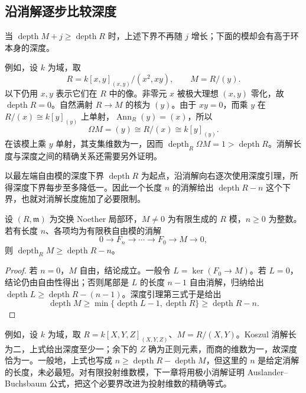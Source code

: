 \subsection{沿消解逐步比较深度}
\label{b3:subsec:1603:03}

当 \(\operatorname{depth}M+j\ge\operatorname{depth}R\) 时，上述下界不再随 \(j\) 增长；下面的模却会有高于环本身的深度。

\ProseParagraphBreak

例如，设 \(k\) 为域，取
\[
	R=k[x,y]_{(x,y)}/(x^2,xy),\qquad M=R/(y).
\]
以下仍用 \(x,y\) 表示它们在 \(R\) 中的像。非零元 \(x\) 被极大理想 \((x,y)\) 零化，故 \(\operatorname{depth}R=0\)。自然满射 \(R\to M\) 的核为 \((y)\)。由于 \(xy=0\)，而乘 \(y\) 在 \(R/(x)\cong k[y]_{(y)}\) 上单射，\(\operatorname{Ann}_R(y)=(x)\)，所以
\[
	\Omega M=(y)\cong R/(x)\cong k[y]_{(y)}.
\]
在该模上乘 \(y\) 单射，其支集维数为一，因而 \(\operatorname{depth}_R\Omega M=1>\operatorname{depth}R\)。消解长度与深度之间的精确关系还需要另外证明。

以最左端自由模的深度下界 \(\operatorname{depth}R\) 为起点，沿消解向右逐次使用深度引理，所得深度下界每步至多降低一。因此一个长度 \(n\) 的消解给出 \(\operatorname{depth}R-n\) 这个下界，也就对消解长度施加了必要限制。

\begin{proposition}\label{b3:prop:finite-resolution-depth-bound}
	设 \((R,\mathfrak m)\) 为交换 Noether 局部环，\(M\ne0\) 为有限生成的 \(R\) 模，\(n\ge0\) 为整数。若有长度 \(n\)、各项均为有限秩自由模的消解
	\[
		0\longrightarrow F_n\longrightarrow\cdots\longrightarrow F_0 \longrightarrow M\longrightarrow0,
	\]
	则 \(\operatorname{depth}_RM\ge\operatorname{depth}R-n\)。
\end{proposition}
\begin{proof}
	若 \(n=0\)，\(M\) 自由，结论成立。一般令 \(L=\ker(F_0\rightarrow M)\)。若 \(L=0\)，结论仍由自由性得出；否则尾部是 \(L\) 的长度 \(n-1\) 自由消解，归纳给出 \(\operatorname{depth}L\ge\operatorname{depth}R-(n-1)\)。深度引理第三式于是给出
	\[
		\operatorname{depth}M\ge \min\{\operatorname{depth}L-1,\operatorname{depth}R\} \ge\operatorname{depth}R-n.
	\]
\end{proof}

例如，设 \(k\) 为域，取 \(R=k[X,Y,Z]_{(X,Y,Z)}\)、\(M=R/(X,Y)\)。Koszul 消解长为二，上式给出深度至少一；余下的 \(Z\) 确为正则元素，而商的维数为一，故深度恰为一。一般地，上式也写成 \(n\ge\operatorname{depth}R-\operatorname{depth}M\)，但这里的 \(n\) 是给定消解的长度，未必最短。对有限投射维数模，下一章将用极小消解证明 Auslander--Buchsbaum 公式，把这个必要界改进为投射维数的精确等式。
